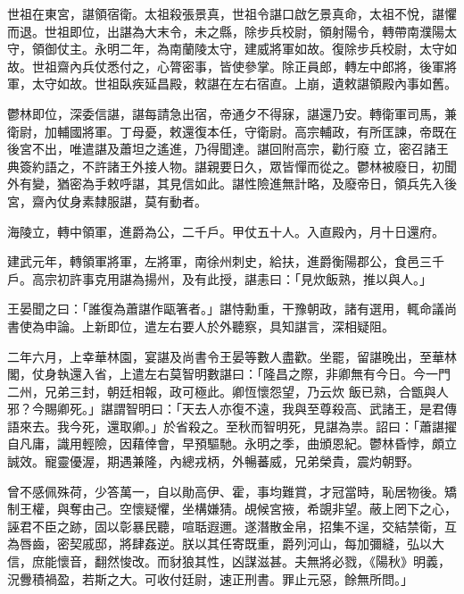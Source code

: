 \begin{pinyinscope}
 世祖在東宮，諶領宿衛。太祖殺張景真，世祖令諶口啟乞景真命，太祖不悅，諶懼而退。世祖即位，出諶為大末令，未之縣，除步兵校尉，領射陽令，轉帶南濮陽太守，領御仗主。永明二年，為南蘭陵太守，建威將軍如故。復除步兵校尉，太守如故。世祖齋內兵仗悉付之，心膂密事，皆使參掌。除正員郎，轉左中郎將，後軍將軍，太守如故。世祖臥疾延昌殿，敕諶在左右宿直。上崩，遺敕諶領殿內事如舊。



 鬱林即位，深委信諶，諶每請急出宿，帝通夕不得寐，諶還乃安。轉衛軍司馬，兼衛尉，加輔國將軍。丁母憂，敕還復本任，守衛尉。高宗輔政，有所匡諫，帝既在後宮不出，唯遣諶及蕭坦之遙進，乃得聞達。諶回附高宗，勸行廢
 立，密召諸王典簽約語之，不許諸王外接人物。諶親要日久，眾皆憚而從之。鬱林被廢日，初聞外有變，猶密為手敕呼諶，其見信如此。諶性險進無計略，及廢帝日，領兵先入後宮，齋內仗身素隸服諶，莫有動者。



 海陵立，轉中領軍，進爵為公，二千戶。甲仗五十人。入直殿內，月十日還府。



 建武元年，轉領軍將軍，左將軍，南徐州刺史，給扶，進爵衡陽郡公，食邑三千戶。高宗初許事克用諶為揚州，及有此授，諶恚曰：「見炊飯熟，推以與人。」



 王晏聞之曰：「誰復為蕭諶作甌箸者。」諶恃勳重，干豫朝政，諸有選用，輒命議尚書使為申論。上新即位，遣左右要人於外聽察，具知諶言，深相疑阻。



 二年六月，上幸華林園，宴諶及尚書令王晏等數人盡歡。坐罷，留諶晚出，至華林閣，仗身執還入省，上遣左右莫智明數諶曰：「隆昌之際，非卿無有今日。今一門二州，兄弟三封，朝廷相報，政可極此。卿恆懷怨望，乃云炊
 飯已熟，合甑與人邪？今賜卿死。」諶謂智明曰：「天去人亦復不遠，我與至尊殺高、武諸王，是君傳語來去。我今死，還取卿。」於省殺之。至秋而智明死，見諶為祟。詔曰：「蕭諶擢自凡庸，識用輕險，因藉倖會，早預驅馳。永明之季，曲頒恩紀。鬱林昏悖，頗立誠效。寵靈優渥，期遇兼隆，內總戎柄，外暢蕃威，兄弟榮貴，震灼朝野。



 曾不感佩殊荷，少答萬一，自以勛高伊、霍，事均難賞，才冠當時，恥居物後。矯制王權，與奪由己。空懷疑懼，坐構嫌猜。覘候宮掖，希覬非望。蔽上罔下之心，誣君不臣之跡，固以彰暴民聽，喧聒遐邇。遂潛散金帛，招集不逞，交結禁衛，互為唇齒，密契戚邸，將肆姦逆。朕以其任寄既重，爵列河山，每加彌縫，弘以大信，庶能懷音，翻然悛改。而豺狼其性，凶謀滋甚。夫無將必戮，《陽秋》明義，況釁積禍盈，若斯之大。可收付廷尉，速正刑書。罪止元惡，餘無所問。」




\end{pinyinscope}
